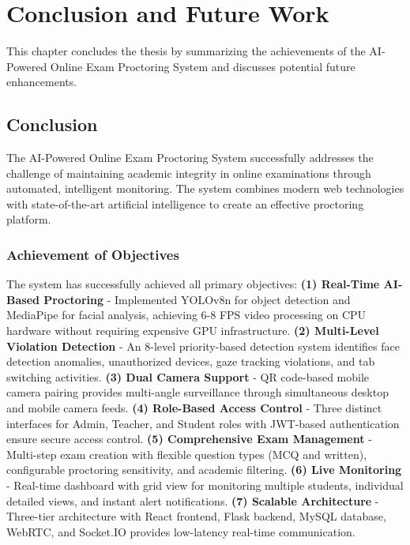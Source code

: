 \chapter{Conclusion and Future Work}

This chapter concludes the thesis by summarizing the achievements of the AI-Powered Online Exam Proctoring System and discusses potential future enhancements.

\section{Conclusion}

The AI-Powered Online Exam Proctoring System successfully addresses the challenge of maintaining academic integrity in online examinations through automated, intelligent monitoring. The system combines modern web technologies with state-of-the-art artificial intelligence to create an effective proctoring platform.

\subsection{Achievement of Objectives}

The system has successfully achieved all primary objectives: \textbf{(1) Real-Time AI-Based Proctoring} - Implemented YOLOv8n for object detection and MediaPipe for facial analysis, achieving 6-8 FPS video processing on CPU hardware without requiring expensive GPU infrastructure. \textbf{(2) Multi-Level Violation Detection} - An 8-level priority-based detection system identifies face detection anomalies, unauthorized devices, gaze tracking violations, and tab switching activities. \textbf{(3) Dual Camera Support} - QR code-based mobile camera pairing provides multi-angle surveillance through simultaneous desktop and mobile camera feeds. \textbf{(4) Role-Based Access Control} - Three distinct interfaces for Admin, Teacher, and Student roles with JWT-based authentication ensure secure access control. \textbf{(5) Comprehensive Exam Management} - Multi-step exam creation with flexible question types (MCQ and written), configurable proctoring sensitivity, and academic filtering. \textbf{(6) Live Monitoring} - Real-time dashboard with grid view for monitoring multiple students, individual detailed views, and instant alert notifications. \textbf{(7) Scalable Architecture} - Three-tier architecture with React frontend, Flask backend, MySQL database, WebRTC, and Socket.IO provides low-latency real-time communication.

